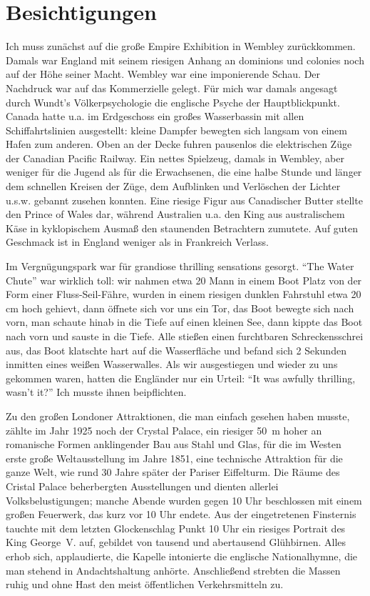 \documentclass[a5paper,pagesize,10pt,twoside=true]{scrbook}
\renewcommand{\marginpar}[2][]{}
\begin{document}
\section{Besichtigungen}
\marginpar{487}
Ich muss zunächst auf die große Empire Exhibition in Wembley zurückkommen. Damals war England mit seinem riesigen Anhang an dominions und colonies noch auf der Höhe seiner Macht. Wembley war eine imponierende Schau. Der Nachdruck war auf das Kommerzielle gelegt. Für mich war damals angesagt durch Wundt's Völkerpsychologie die englische Psyche der Hauptblickpunkt. Canada hatte u.a. im Erdgeschoss ein großes Wasserbassin mit allen Schiffahrtslinien ausgestellt: kleine Dampfer bewegten sich langsam von einem Hafen zum anderen. Oben an der Decke fuhren pausenlos die elektrischen Züge der Canadian Pacific Railway. Ein nettes Spielzeug, damals in Wembley, aber weniger für die Jugend als für die Erwachsenen, die eine halbe Stunde und länger dem schnellen Kreisen der Züge, dem Aufblinken und Verlöschen der Lichter u.s.w. gebannt zusehen konnten. Eine riesige Figur aus Canadischer Butter stellte den Prince of Wales dar, während Australien u.a. den King aus australischem Käse in kyklopischem Ausmaß den staunenden Betrachtern zumutete. Auf guten Geschmack ist in England weniger als in Frankreich Verlass.

Im Vergnügungspark war für grandiose thrilling sensations gesorgt. \enquote{The Water Chute} war wirklich toll: wir nahmen etwa 20 Mann in einem Boot Platz von der Form einer Fluss-Seil-Fähre, wurden in einem riesigen dunklen Fahrstuhl etwa 20 cm hoch gehievt, dann öffnete sich vor uns ein Tor, das Boot bewegte sich nach vorn, man schaute hinab in die Tiefe auf einen kleinen See, dann kippte das Boot nach vorn und sauste in die Tiefe. Alle stießen einen furchtbaren Schreckensschrei aus, das Boot klatschte hart auf die Wasserfläche und befand sich 2 Sekunden inmitten eines weißen Wasserwalles. Als wir ausgestiegen und wieder zu uns gekommen waren, hatten die Engländer nur ein Urteil: \enquote{It was awfully thrilling, wasn't it?} Ich musste ihnen beipflichten.

Zu den großen Londoner Attraktionen, die man einfach gesehen haben musste, zählte im Jahr 1925 noch der Crystal Palace, ein riesiger 50~m hoher an romanische Formen anklingender Bau aus Stahl und Glas, für die im Westen erste große Weltausstellung im Jahre 1851, eine technische Attraktion für die ganze Welt, wie rund 30 Jahre später der Pariser Eiffelturm. Die Räume des Cristal Palace beherbergten Ausstellungen und dienten allerlei Volksbelustigungen; manche Abende wurden gegen 10 Uhr beschlossen mit einem großen Feuerwerk, das kurz vor 10 Uhr endete. Aus der eingetretenen Finsternis tauchte mit dem letzten Glockenschlag Punkt 10 Uhr ein riesiges Portrait des King George~V. auf, gebildet von tausend und abertausend Glühbirnen. Alles erhob sich, applaudierte, die Kapelle intonierte die englische Nationalhymne, die man stehend in Andachtshaltung anhörte. Anschließend strebten die Massen ruhig und ohne Hast den meist öffentlichen Verkehrsmitteln zu.
\end{document}
